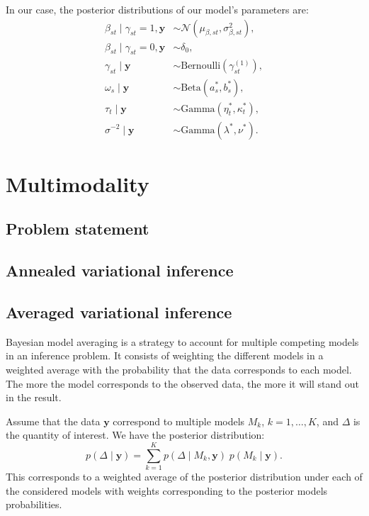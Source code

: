 \documentclass[a4paper, 11pt]{report}
\numberwithin{equation}{chapter}
\begin{document}
In our case, the posterior distributions of our model's parameters are:
\begin{align*}
\beta_{st} \mid \gamma_{st} = 1, \boldsymbol{y} &\sim \mathcal{N}\left(\mu_{\beta, st},\sigma^2_{\beta, st}\right),\\
\beta_{st} \mid \gamma_{st} = 0, \boldsymbol{y} &\sim \delta_0,\\
\gamma_{st} \mid \boldsymbol{y} &\sim \text{Bernoulli}(\gamma_{st}^{(1)}),\\
\omega_s\mid\boldsymbol{y} &\sim \text{Beta}(a_s^*,b_s^*),\\
\tau_t\mid \boldsymbol{y} &\sim \text{Gamma}(\eta^*_t, \kappa^*_t),\\
\sigma^{-2} \mid \boldsymbol{y} &\sim \text{Gamma}(\lambda^*, \nu^*).
\end{align*}

\newpage
\chapter{Multimodality}
\section{Problem statement}
\section{Annealed variational inference}
\section{Averaged variational inference}
Bayesian model averaging is a strategy to account for multiple competing models in an inference problem. It consists of weighting the different models in a weighted average with the probability that the data corresponds to each model. The more the model corresponds to the observed data, the more it will stand out in the result.

Assume that the data $\boldsymbol{y}$ correspond to multiple models $M_k$, $k= 1,\ldots,K$, and $\Delta$ is the quantity of interest. We have the posterior distribution:
\begin{equation}
p(\Delta \mid \boldsymbol{y}) = \sum_{k=1}^K p(\Delta \mid M_k,\boldsymbol{y}) \; p(M_k \mid \boldsymbol{y}).
\label{eq:post_dist}
\end{equation}
This corresponds to a weighted average of the posterior distribution under each of the considered models with weights corresponding to the posterior models probabilities.
\end{document}
